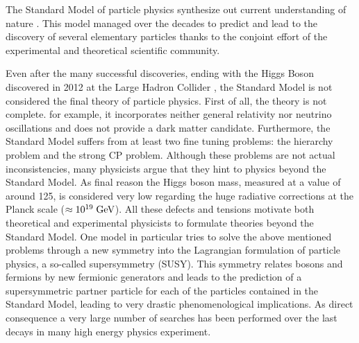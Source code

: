 The Standard Model of particle physics synthesize out current understanding of nature \cite{Spiesberger:2000ks}. This model managed over the decades to predict and lead to the discovery of several elementary particles thanks to the conjoint effort of the experimental and theoretical scientific community. 

Even after the many successful discoveries, ending with the Higgs Boson discovered in 2012 at the Large Hadron Collider \cite{Aad:2012tfa,Chatrchyan:2012xdj}, the Standard Model is not considered the final theory of particle physics. First of all, the theory is not complete. for example, it incorporates neither general relativity nor neutrino oscillations and does not provide a dark matter candidate. Furthermore, the Standard Model suffers from at least two fine tuning problems: the hierarchy problem and the strong CP problem. Although these problems are not actual inconsistencies, many physicists argue that they hint to physics beyond the Standard Model. As final reason the Higgs boson mass, measured at a value of around 125\gev, is considered very low regarding the huge radiative corrections at the Planck scale ($\approx 10^{19}\;\text{Ge}\kern-0.06667em\text{V}$). All these defects and tensions motivate both theoretical and experimental physicists to formulate theories beyond the Standard Model. One model in particular tries to solve the above mentioned problems through a new symmetry into the Lagrangian formulation of particle physics, a so-called supersymmetry (SUSY). This symmetry relates bosons and fermions by new fermionic generators and leads to the prediction of a supersymmetric partner particle for each of the particles contained in the Standard Model, leading to very drastic phenomenological implications. As direct consequence a very large number of searches has been performed over the last decays in many high energy physics experiment. 

